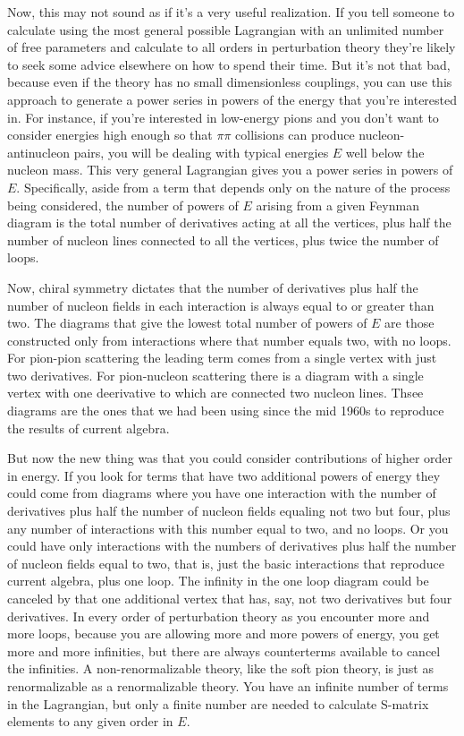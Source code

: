 \documentclass[12pt]{article}
\begin{document}
Now, this may not sound as if it's a very useful realization.  If you tell someone to calculate using the most general possible Lagrangian with an unlimited number of free parameters and calculate to all orders in perturbation theory they're likely to seek some advice elsewhere on how to spend their time. But it's not that bad, because even if the theory has no small dimensionless couplings, you can use this approach to generate a power series in powers of the energy that you're interested in. For instance, if you're interested in low-energy pions and you don't want to consider energies high enough so that  $\pi\pi$ collisions can produce nucleon-antinucleon pairs, you will be dealing with typical energies $E$  well below the nucleon mass. This very general Lagrangian gives you a power series in powers of $E$.  Specifically, aside from a term that depends only on the nature of the process being considered, the number of powers of $E$ arising from a given Feynman diagram is the total number of derivatives acting at all the vertices, plus half the number of nucleon lines connected to all the vertices, plus twice the number of loops.  

Now, chiral symmetry dictates that the number of derivatives plus half the number of nucleon fields in each interaction is always equal to or greater than two. The diagrams that give the lowest total number of powers of $E$ are those constructed only from  interactions where that number equals two, with no loops.  For pion-pion scattering the leading term comes from a single vertex with just two derivatives.  For pion-nucleon scattering there is a diagram with  a single vertex with one deerivative to which are connected two nucleon lines.  Thsee diagrams  are the ones that we had  been using since the mid 1960s to reproduce the results of current algebra.

But now the new thing was that you could consider contributions of higher order in energy. If you look for terms that have two additional powers of energy they could come from diagrams where you have one interaction with the number of derivatives plus half the number of nucleon fields equaling not two but four, plus any number of interactions with this number equal to two, and no loops. 
Or you could have only interactions with the numbers of derivatives plus half the number of nucleon fields equal to two, that is, just the basic interactions that reproduce current algebra, plus one loop.  The infinity in the one loop diagram could be canceled by that one additional vertex that has, say, not two derivatives but four derivatives. In every order of perturbation theory as you encounter more and more loops, because you are allowing more and more powers of energy, you get more and more infinities, but there are always counterterms available to cancel the infinities. A non-renormalizable theory, like the soft pion theory, is just as renormalizable as a renormalizable theory.  You have an infinite number of terms in the Lagrangian, but only a finite number are needed to calculate S-matrix elements to any  given order in $E$.
\end{document}
